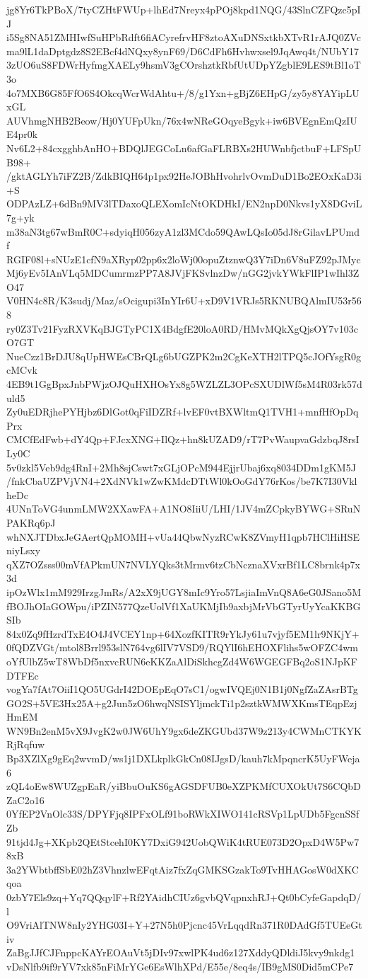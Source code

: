 jg8Yr6TkPBoX/7tyCZHtFWUp+lhEd7Nreyx4pPOj8kpd1NQG/43SlnCZFQzc5pIJ
i5Sg8NA51ZMHIwfSuHPbRdft6fiACyrefrvHF8ztoAXuDNSxtkbXTvR1rAJQ0ZVc
ma9lL1daDptgdz8S2EBcf4dNQxy8ynF69/D6CdFh6Hvhwxsel9JqAwq4t/NUbY17
3zUO6uS8FDWrHyfmgXAELy9hsmV3gCOrshztkRbfUtUDpYZgblE9LES9tBl1oT3o
4o7MXB6G85FfO6S4OkcqWcrWdAhtu+/8/g1Yxn+gBjZ6EHpG/zy5y8YAYipLUxGL
AUVhmgNHB2Beow/Hj0YUFpUkn/76x4wNReGOqyeBgyk+iw6BVEgnEmQzIUE4pr0k
Nv6L2+84cxgghbAnHO+BDQlJEGCoLn6afGaFLRBXs2HUWnbfjctbuF+LFSpUB98+
/gktAGLYh7iFZ2B/ZdkBIQH64p1px92HeJOBhHvohrlvOvmDuD1Bo2EOxKaD3i+S
ODPAzLZ+6dBn9MV3lTDaxoQLEXomIcNtOKDHkI/EN2npD0Nkvs1yX8DGviL7g+yk
m38aN3tg67wBmR0C+sdyiqH056zyA1zl3MCdo59QAwLQsIo05dJ8rGilavLPUmdf
RGIF08l+sNUzE1cfN9aXRyp02pp6x2loWj00opuZtznwQ3Y7iDn6V8uFZ92pJMyc
Mj6yEv5IAnVLq5MDCumrmzPP7A8JVjFKSvlnzDw/nGG2jvkYWkFlIP1wIhl3ZO47
V0HN4c8R/K3sudj/Maz/sOcigupi3InYIr6U+xD9V1VRJs5RKNUBQAlmIU53r568
ry0Z3Tv21FyzRXVKqBJGTyPC1X4BdgfE20loA0RD/HMvMQkXgQjsOY7v103cO7GT
NueCzz1BrDJU8qUpHWEsCBrQLg6bUGZPK2m2CgKeXTH2lTPQ5cJOfYsgR0gcMCvk
4EB9t1GgBpxJnbPWjzOJQuHXHOsYx8g5WZLZL3OPcSXUDlWf5sM4R03rk57duld5
Zy0uEDRjhePYHjbz6DlGot0qFiIDZRf+lvEF0vtBXWltmQ1TVH1+mnfHfOpDqPrx
CMCfEdFwb+dY4Qp+FJcxXNG+IlQz+hn8kUZAD9/rT7PvWaupvaGdzbqJ8rsILy0C
5v0zkl5Veb9dg4RnI+2Mh8sjCswt7xGLjOPcM944EjjrUbaj6xq8034DDm1gKM5J
/fnkCbaUZPVjVN4+2XdNVk1wZwKMdcDTtWl0kOoGdY76rKos/be7K7I30VklheDc
4UNnToVG4unmLMW2XXawFA+A1NO8IiiU/LHI/1JV4mZCpkyBYWG+SRuNPAKRq6pJ
whNXJTDbxJeGAertQpMOMH+vUa44QbwNyzRCwK8ZVmyH1qpb7HClHiHSEniyLsxy
qXZ7OZsss00mVfAPkmUN7NVLYQks3tMrmv6tzCbNcznaXVxrBf1LC8brnk4p7x3d
ipOzWlx1mM929IrzgJmRs/A2xX9jUGY8mIc9Yro57LsjiaImVnQ8A6eG0JSano5M
fBOJhOIaGOWpu/iPZIN577QzeUolVf1XaUKMjIb9axbjMrVbGTyrUyYcaKKBGSIb
84x0Zq9fHzrdTxE4O4J4VCEY1np+64XozfKITR9rYkJy61u7vjyf5EM1lr9NKjY+
0fQDZVGt/mtol8Brrl953slN764vg6lIV7VSD9/RQYlI6hEHOXFlihs5wOFZC4wm
oYfUlbZ5wT8WbDf5nxvcRUN6eKKZaAlDiSkhcgZd4W6WGEGFBq2oS1NJpKFDTFEc
vogYa7fAt7OiiI1QO5UGdrI42DOEpEqO7sC1/ogwIVQEj0N1B1j0NgfZaZAsrBTg
GO2S+5VE3Hx25A+g2Jun5zO6hwqNSISYljmckTi1p2sztkWMWXKmsTEqpEzjHmEM
WN9Bn2enM5vX9JvgK2w0JW6UhY9gx6deZKGUbd37W9z213y4CWMnCTKYKRjRqfuw
Bp3XZlXg9gEq2wvmD/ws1j1DXLkplkGkCn08IJgsD/kauh7kMpqncrK5UyFWeja6
zQL4oEw8WUZgpEaR/yiBbuOuKS6gAGSDFUB0eXZPKMfCUXOkUt7S6CQbDZaC2o16
0YfEP2VnOlc33S/DPYFjq8IPFxOLf91boRWkXIWO141cRSVp1LpUDb5FgcnSSfZb
91tjd4Jg+XKpb2QEtStcehI0KY7DxiG942UobQWiK4tRUE073D2OpxD4W5Pw78xB
3a2YWbtbffSbE02hZ3VhnzlwEFqtAiz7fxZqGMKSGzakTo9TvHHAGosW0dXKCqoa
0zbY7Els9zq+Yq7QQqylF+Rf2YAidhCIUz6gvbQVqpnxhRJ+Qt0bCyfeGapdqD/l
O9VriAlTNW8nIy2YHG03I+Y+27N5h0Pjcnc45VrLqqdRn371R0DAdGf5TUEeGtiv
ZaBgJJfCJFnppcKAYrEOAuVt5jDIv97xwlPK4ud6z127XddyQDldiJ5kvy9nkdg1
vDsNlfb9if9rYV7xk85nFiMrYGe6EsWlhXPd/E55e/8eq4s/IB9gMS0Did5mCPe7
